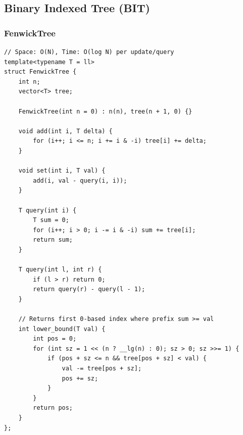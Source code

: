 \documentclass[9pt,a4paper,twocolumn]{extarticle}
\begin{document}
\subsection{Binary Indexed Tree (BIT)}

\filbreak
\subsubsection{FenwickTree}
\nopagebreak
\begin{lstlisting}
// Space: O(N), Time: O(log N) per update/query
template<typename T = ll>
struct FenwickTree {
    int n;
    vector<T> tree;

    FenwickTree(int n = 0) : n(n), tree(n + 1, 0) {}

    void add(int i, T delta) {
        for (i++; i <= n; i += i & -i) tree[i] += delta;
    }

    void set(int i, T val) {
        add(i, val - query(i, i));
    }

    T query(int i) {
        T sum = 0;
        for (i++; i > 0; i -= i & -i) sum += tree[i];
        return sum;
    }

    T query(int l, int r) {
        if (l > r) return 0;
        return query(r) - query(l - 1);
    }

    // Returns first 0-based index where prefix sum >= val
    int lower_bound(T val) {
        int pos = 0;
        for (int sz = 1 << (n ? __lg(n) : 0); sz > 0; sz >>= 1) {
            if (pos + sz <= n && tree[pos + sz] < val) {
                val -= tree[pos + sz];
                pos += sz;
            }
        }
        return pos;
    }
};
\end{lstlisting}

\filbreak
\end{document}
